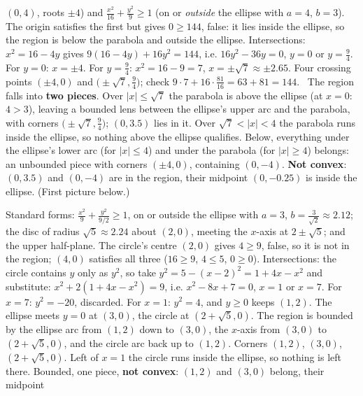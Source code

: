 \begin{solutions}
        $(0,4)$, roots $\pm4$) and $\tfrac{x^{2}}{16}+\tfrac{y^{2}}{9}\ge1$
        (on or \emph{outside} the ellipse with $a=4$, $b=3$). The origin
        satisfies the first but gives $0\ge144$, false: it lies inside the
        ellipse, so the region is below the parabola and outside the
        ellipse. Intersections: $x^{2}=16-4y$ gives
        $9(16-4y)+16y^{2}=144$, i.e. $16y^{2}-36y=0$, $y=0$ or
        $y=\tfrac94$. For $y=0$: $x=\pm4$. For $y=\tfrac94$:
        $x^{2}=16-9=7$, $x=\pm\sqrt7\approx\pm2.65$. Four crossing points
        $(\pm4,0)$ and $\bigl(\pm\sqrt7,\tfrac94\bigr)$; check
        $9\cdot7+16\cdot\tfrac{81}{16}=63+81=144$. \checkmark\ The region
        falls into \textbf{two pieces}. Over $|x|\le\sqrt7$ the parabola
        is above the ellipse (at $x=0$: $4>3$), leaving a bounded lens
        between the ellipse's upper arc and the parabola, with corners
        $\bigl(\pm\sqrt7,\tfrac94\bigr)$; $(0,3.5)$ lies in it. Over
        $\sqrt7<|x|<4$ the parabola runs inside the ellipse, so nothing
        above the ellipse qualifies. Below, everything under the ellipse's
        lower arc (for $|x|\le4$) and under the parabola (for $|x|\ge4$)
        belongs: an unbounded piece with corners $(\pm4,0)$, containing
        $(0,-4)$. \textbf{Not convex}: $(0,3.5)$ and $(0,-4)$ are in the
        region, their midpoint $(0,-0.25)$ is inside the ellipse. (First
        picture below.)
  \item Standard forms: $\tfrac{x^{2}}{9}+\tfrac{y^{2}}{9/2}\ge1$, on or
        outside the ellipse with $a=3$, $b=\tfrac{3}{\sqrt2}\approx2.12$;
        the disc of radius $\sqrt5\approx2.24$ about $(2,0)$, meeting the
        $x$-axis at $2\pm\sqrt5$; and the upper half-plane. The circle's
        centre $(2,0)$ gives $4\ge9$, false, so it is not in the region;
        $(4,0)$ satisfies all three ($16\ge9$, $4\le5$, $0\ge0$).
        Intersections: the circle contains $y$ only as $y^{2}$, so take
        $y^{2}=5-(x-2)^{2}=1+4x-x^{2}$ and substitute:
        $x^{2}+2(1+4x-x^{2})=9$, i.e. $x^{2}-8x+7=0$, $x=1$ or $x=7$. For
        $x=7$: $y^{2}=-20$, discarded. For $x=1$: $y^{2}=4$, and $y\ge0$
        keeps $(1,2)$. The ellipse meets $y=0$ at $(3,0)$, the circle at
        $(2+\sqrt5,0)$. The region is bounded by the ellipse arc from
        $(1,2)$ down to $(3,0)$, the $x$-axis from $(3,0)$ to
        $(2+\sqrt5,0)$, and the circle arc back up to $(1,2)$. Corners
        $(1,2)$, $(3,0)$, $(2+\sqrt5,0)$. Left of $x=1$ the circle runs
        inside the ellipse, so nothing is left there. Bounded, one piece,
        \textbf{not convex}: $(1,2)$ and $(3,0)$ belong, their midpoint

\end{solutions}
